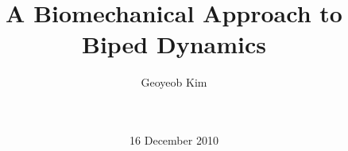 \documentclass{acm_proc_article-sp}
\begin{document}
\title{A Biomechanical Approach to Biped Dynamics}
%
%
%
%
%

%
\author{
%
%
\alignauthor
Geoyeob Kim\\
       \\
       \\
}

\date{16 December 2010}
\end{document}

